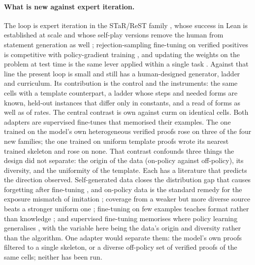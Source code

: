 \documentclass[11pt]{article}
\begin{document}
\paragraph{What is new against expert iteration.} The loop is expert
iteration \citep{anthony2017exit,polu2020gptf,polu2022curriculum} in the
STaR/ReST family
\citep{zelikman2022star,gulcehre2023rest,singh2024restem,yuan2023scaling},
whose success in Lean is established at scale
\citep{xin2024deepseekprover,xin2024deepseekprover15,ren2025deepseekproverv2,lin2025goedel,deepmind2024alphaproof}
and whose self-play versions remove the human from statement generation
as well \citep{dong2025stp,lample2022htps,lin2024leanstar,zhao2025absolutezero};
rejection-sampling fine-tuning on verified positives is competitive with
policy-gradient training \citep{xiong2025raft}, and updating the weights
on the problem at test time is the same lever applied within a single
task \citep{wang2025thetaevolve,yuksekgonul2026ttt}. Against that line the
present loop is small and still has a human-designed generator, ladder and
curriculum. Its contribution is the control and the instruments: the same
cells with a template counterpart, a ladder whose steps and needed forms
are known, held-out instances that differ only in constants, and a read
of forms as well as of rates. The central contrast is own against curm on identical cells. Both adapters are supervised fine-tunes that
memorised their examples. The one trained on the model's own
heterogeneous verified proofs rose on three of the four new families; the
one trained on uniform template proofs wrote its nearest trained
skeleton and rose on none. That contrast confounds three things the
design did not separate: the origin of the data (on-policy against
off-policy), its diversity, and the uniformity of the template. Each has a
literature that predicts the direction observed. Self-generated data
closes the distribution gap that causes forgetting after fine-tuning
\citep{yang2024selfdistillation,luo2023forgetting}, and on-policy data
is the standard remedy for the exposure mismatch of imitation
\citep{agarwal2024onpolicy}; coverage from a weaker but more diverse
source beats a stronger uniform one \citep{bansal2024weaker}; fine-tuning on few examples teaches format rather than knowledge \citep{zhou2023lima}; and supervised fine-tuning memorises
where policy learning generalises \citep{chu2025sftrl}, with the variable
here being the data's origin and diversity rather than the algorithm. One
adapter would separate them: the model's own proofs filtered to a single
skeleton, or a diverse off-policy set of verified proofs of the same cells; neither has been run.
\end{document}
